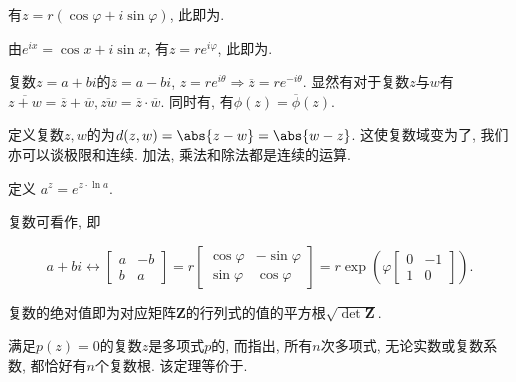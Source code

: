 \documentclass[8pt]{article}
\begin{document}
		 有\(z = r \left(\cos \varphi + i \sin \varphi\right)\), 此即为.

		 由\(e^{ix} = \cos x + i \sin x\), 有\(z = r e^{i\varphi}\), 此即为. \cite{wiki-comp}

		 复数\(z = a + bi\)的\(\overline{z} = a - bi\), \(z = re^{i \theta} \Rightarrow \overline{z} = re^{-i\theta}\). 显然有对于复数\(z\)与\(w\)有\(\overline{z + w} = \overline{z} + \overline{w}, \overline{zw} = \overline{z} \cdot \overline{w}\). 同时有, 有\(\phi(z) = \overline \phi(z)\). \cite{wiki-comconj}
		
		 定义复数\(z, w\)的为\(d(z, w) = \abs{z - w} = \abs{w - z}\). 这使复数域变为了, 我们亦可以谈极限和连续. 加法, 乘法和除法都是连续的运算. \cite{wiki-comp} \cite{wiki-metric}

		 定义 \(a^z = e^{z \cdot \ln a}\).

		 复数可看作, 即
		
		\begin{displaymath}		
			a + bi \leftrightarrow \left[
				\begin{array}{cc}
					a & -b\\
					b & a
				\end{array}
			\right] = r \left[
				\begin{array}{cc}
					\cos \varphi & - \sin \varphi\\
					\sin \varphi & \cos \varphi
				\end{array}
			\right] = r \exp \left( \varphi \left[
				\begin{array}{cc}
					0 & -1\\
					1 & 0
				\end{array}
			\right] \right).
		\end{displaymath}

		复数的绝对值即为对应矩阵\(\mathbf{Z}\)的行列式的值的平方根\(\displaystyle \sqrt{\det \mathbf{Z}}\).

		 满足\(p(z) = 0\)的复数\(z\)是多项式\(p\)的, 而指出, 所有\(n\)次多项式, 无论实数或复数系数, 都恰好有\(n\)个复数根. 该定理等价于.
\end{document}
